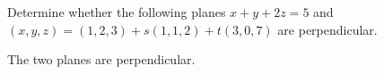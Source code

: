 
\begin{Exercise}[
name={},
title={}, 
difficulty=0,
origin={\cite{BS}}]
Determine whether the following planes $x+y+2z=5$ and $(x, y, z)=(1, 2, 3)+s(1, 1, 2)+t(3, 0, 7)$ are perpendicular.

\end{Exercise}
\begin{Answer}
The two planes are perpendicular.
\end{Answer}
